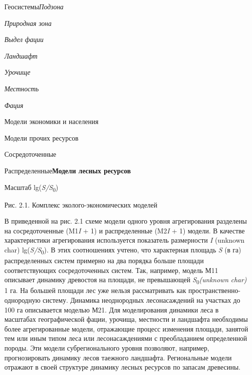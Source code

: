 \documentclass{article}
\begin{document}
Геосистемы\textit{Подзона}

\textit{Природная зона}

\textit{Выдел фации       }

\textit{Ландшафт }

\textit{Урочище}

\textit{Местность}

\textit{Фация}

\begin{center}
Модели   экономики и населения

Модели прочих ресурсов
\end{center}

Сосредоточенные 

Распределенные\textbf{Модели лесных ресурсов}

Масштаб lg(\textit{S/S}\textsubscript{0})

\begin{center}
Рис. 2.1. Комплекс эколого-экономических моделей
\end{center}

В приведенной на рис. 2.1 схеме модели одного 
уровня агрегирования разделены на сосредоточенные 
(M1\textit{I} + 1) и распределенные (M2\textit{I} + 1) модели. 
В качестве характеристики агрегирования используется 
показатель размерности \textit{I} (unknown char) lg(\textit{S/S}\textsubscript{0}). 
В этих соотношениях учтено, что характерная 
площадь \textit{S} (в га) распределенных систем примерно 
на два порядка больше площади соответствующих 
сосредоточенных систем. Так, например, модель 
М11 описывает динамику древостоя на площади, 
не превышающей \textit{S}\textsubscript{0}\textit{(unknown char)} 
1 га. На большей площади лес уже нельзя рассматривать 
как пространственно-однородную систему. Динамика 
неоднородных лесонасаждений на участках до 
100 га описывается моделью М21. Для моделирования 
динамики леса в масштабах географической фации, 
урочища, местности и ландшафта необходимы более 
агрегированные модели, отражающие процесс 
изменения площади, занятой тем или иным типом 
леса или лесонасаждениями с преобладанием 
определенной породы. Эти модели субрегионального 
уровня позволяют, например, прогнозировать 
динамику лесов таежного ландшафта. Региональные 
модели отражают в своей структуре динамику 
лесных ресурсов по запасам древесины.
\end{document}
